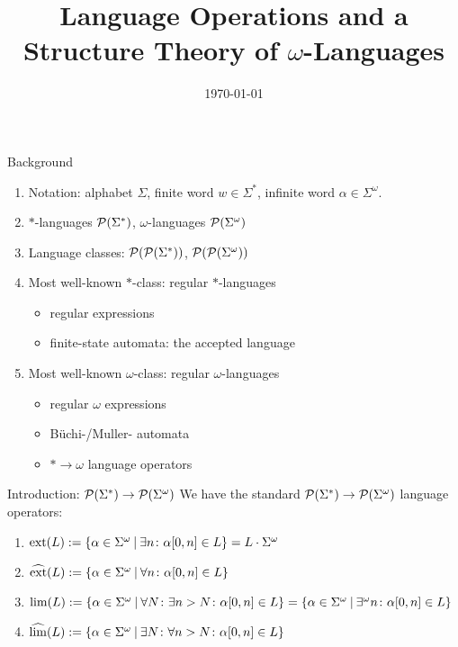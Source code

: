 \documentclass[
	notheorems,noamsthm]{beamer}
\title[Kurzform]{Language Operations and a Structure Theory of $\omega$-Languages}
\date{\today}
\begin{document}
\frame{\titlepage}


\begin{frame}[<+->]{Background}
\begin{enumerate}
\item Notation: alphabet $\Sigma$, finite word $w \in \Sigma^*$, infinite word $\alpha \in \Sigma^\omega$.
\item $*$-languages $\mathcal{P}(\Sigma^*)$, $\omega$-languages $\mathcal{P}(\Sigma^\omega)$
\item Language classes: $\mathcal{P}(\mathcal{P}(\Sigma^*))$, $\mathcal{P}(\mathcal{P}(\Sigma^\omega))$
\item Most well-known $*$-class: regular $*$-languages
\begin{itemize}
\item regular expressions
\item finite-state automata: the accepted language
\end{itemize}
\item Most well-known $\omega$-class: regular $\omega$-languages
\begin{itemize}
\item regular $\omega$ expressions
\item Büchi-/Muller- automata
\item $* \rightarrow \omega$ language operators
\end{itemize}
\end{enumerate}
\end{frame}

\begin{frame}[<+->]{Introduction: $\mathcal{P}(\Sigma^*) \rightarrow \mathcal{P}(\Sigma^\omega)$}
We have the standard $\mathcal{P}(\Sigma^*) \rightarrow \mathcal{P}(\Sigma^\omega)$ language operators:

\begin{enumerate}
\item $\ext(L) := \Set{\alpha \in \Sigma^\omega}{ \exists n \colon \alpha[0,n] \in L} = L \cdot \Sigma^\omega$
\item $\dext(L) := \Set{\alpha \in \Sigma^\omega}{ \forall n \colon \alpha[0,n] \in L}$
\item $\lim(L) := \Set{ \alpha \in \Sigma^\omega }{ \forall N \colon \exists n > N \colon \alpha[0,n] \in L } = \Set{ \alpha \in \Sigma^\omega }{ \exists^\omega n \colon \alpha[0,n] \in L }$
\item $\dlim(L) := \Set{ \alpha \in \Sigma^\omega }{ \exists N \colon \forall n > N \colon \alpha[0,n] \in L }$
\end{enumerate}
\end{frame}
\end{document}
